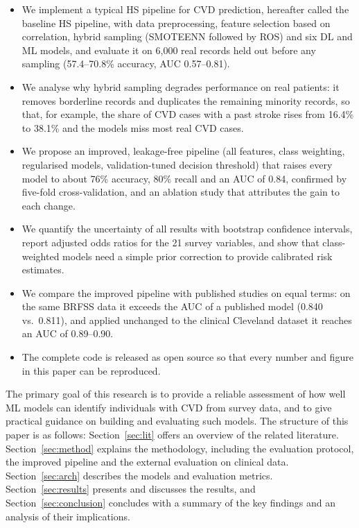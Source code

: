 \documentclass[11pt,a4paper]{article}
\begin{document}
\begin{itemize}
  \item We implement a typical HS pipeline for CVD prediction, hereafter
    called the baseline HS pipeline, with data preprocessing, feature selection based
    on correlation, hybrid sampling (SMOTEENN followed by ROS) and six DL
    and ML models, and evaluate it on 6,000 real records held out before any
    sampling (57.4--70.8\% accuracy, AUC 0.57--0.81).
  \item We analyse why hybrid sampling degrades performance on real
    patients: it removes borderline records and duplicates the remaining
    minority records, so that, for example, the share of CVD cases with a
    past stroke rises from 16.4\% to 38.1\% and the models miss most real
    CVD cases.
  \item We propose an improved, leakage-free pipeline (all features, class
    weighting, regularised models, validation-tuned decision threshold)
    that raises every model to about 76\% accuracy, 80\% recall and an AUC of
    0.84, confirmed by five-fold cross-validation, and an ablation study
    that attributes the gain to each change.
  \item We quantify the uncertainty of all results with bootstrap
    confidence intervals, report adjusted odds ratios for the 21 survey
    variables, and show that class-weighted models need a simple prior
    correction to provide calibrated risk estimates.
  \item We compare the improved pipeline with published studies on equal
    terms: on the same BRFSS data it exceeds the AUC of a published model
    (0.840 vs.\ 0.811), and
    applied unchanged to the clinical Cleveland dataset it reaches an AUC
    of 0.89--0.90.
  \item The complete code is released as open source so that every number
    and figure in this paper can be reproduced.
\end{itemize}

The primary goal of this research is to provide a reliable assessment of
how well ML models can identify individuals with CVD from survey data, and to give practical
guidance on building and evaluating such models. The structure of this
paper is as follows: Section~\ref{sec:lit} offers an overview of the related
literature. Section~\ref{sec:method} explains the methodology, including the
evaluation protocol, the improved pipeline and the external evaluation on
clinical data.
Section~\ref{sec:arch} describes the models and evaluation metrics.
Section~\ref{sec:results} presents and discusses the results, and
Section~\ref{sec:conclusion} concludes with a summary of the key findings and
an analysis of their implications.
\end{document}

